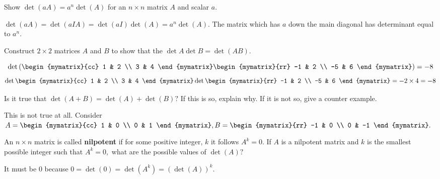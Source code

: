\begin{enumialphparenastyle}
\begin{ex} Show $\det \left( aA\right) =a^{n}\det \left( A\right) $ for an $n \times n $ matrix $A
$ and scalar $a$. 
\begin{sol}
$\det \left( aA\right) =\det
\left( aIA\right) =\det \left( aI\right) \det \left( A\right) =a^{n}\det
\left( A\right) .$ The matrix which has $a$ down the main diagonal has
determinant equal to $a^{n}$.
\end{sol}
\end{ex}


\begin{ex} Construct $2\times 2$ matrices $A$ and $B$ to show that the
$\det A \det B = \det (AB)$. 
\begin{sol}
\[
\det
\left( \begin{mymatrix}{cc}
1 & 2 \\
3 & 4
\end{mymatrix} \begin{mymatrix}{rr}
-1 & 2 \\
-5 & 6
\end{mymatrix} \right) = -8
\]
\[
\det \begin{mymatrix}{cc}
1 & 2 \\
3 & 4
\end{mymatrix} \det \begin{mymatrix}{rr}
-1 & 2 \\
-5 & 6
\end{mymatrix} = -2 \times 4 = -8
\]
\end{sol}
\end{ex}

\begin{ex} Is it true that $\det \left( A+B\right) =\det \left( A\right) +\det
\left( B\right) ?$ If this is so, explain why. If it is not so,
give a counter example.  
\begin{sol}
This is not true at all. Consider $A=\begin{mymatrix}{cc}
1 & 0 \\
0 & 1
\end{mymatrix} ,B=\begin{mymatrix}{rr}
-1 & 0 \\
0 & -1
\end{mymatrix} .$
\end{sol}
\end{ex}

\begin{ex} An $n\times n$ matrix is called \textbf{nilpotent}
 if for some positive integer, $k$ it follows $A^{k}=0.$ If
$A$ is a nilpotent matrix and $k$ is the smallest possible integer such that
$A^{k}=0,$ what are the possible values of $\det \left( A\right) ?$ 
\begin{sol}
It must
be 0 because $0=\det \left( 0\right) =\det \left( A^{k}\right) =\left( \det
\left( A\right) \right) ^{k}.$
\end{sol}
\end{ex}


\end{enumialphparenastyle}
